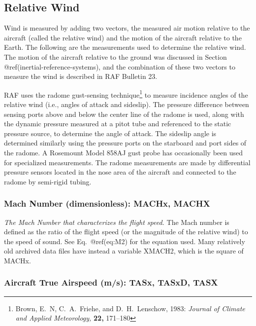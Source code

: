 \documentclass[
  english,
]{book}
\begin{document}
\hypertarget{relative-wind}{%
\subsection{Relative Wind}\label{relative-wind}}

Wind is measured by adding two vectors, the measured air motion relative
to the aircraft (called the relative wind) and the motion of the
aircraft relative to the Earth. The following are the measurements used
to determine the relative wind. The motion of the aircraft relative to
the ground was discussed in Section @ref(inertial-reference-systems),
and the combination of these two vectors to measure the wind is
described in RAF Bulletin 23.

RAF uses the
radome\protect\hypertarget{radomeux20gust-sensingux20system}{}{}
gust-sensing technique\footnote{Brown, E.~N, C.~A.~Friehe, and
  D.~H.~Lenschow, 1983: \emph{Journal of Climate and Applied
  Meteorology,} \textbf{22,} 171--180} to measure incidence angles of
the relative wind (i.e., angles of attack and sideslip). The pressure
difference between sensing ports above and below the center line of the
radome is used, along with the dynamic pressure measured at a pitot tube
and referenced to the static pressure source, to determine the angle of
attack. The sideslip angle is determined similarly using the pressure
ports on the starboard and port sides of the radome. A Rosemount Model
858AJ gust probe has occasionally been used for specialized
measurements. The radome measurements are made by differential pressure
sensors located in the nose area of the aircraft and connected to the
radome by semi-rigid tubing.

\hypertarget{mach-number}{%
\subsubsection*{Mach Number (dimensionless): MACHx,
MACHX}\label{mach-number}}

\emph{The Mach Number that characterizes the flight speed.} The Mach
number is defined as the ratio of the flight speed (or the magnitude of
the relative wind) to the speed of sound. See Eq.~@ref(eq:M2) for the
equation used. Many relatively old archived data files have instead a
variable XMACH2, which is the square of MACHx.

\hypertarget{true-airspeed}{%
\subsubsection*{Aircraft True Airspeed (m/s): TASx, TASxD,
TASX}\label{true-airspeed}}
\end{document}
